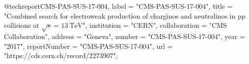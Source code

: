 @techreport{CMS-PAS-SUS-17-004,
      label          = "CMS-PAS-SUS-17-004",
      title         = "{Combined search for electroweak production of charginos
                       and neutralinos in pp collisions at $\sqrt{s} =
                       13~\mathrm{TeV}$}",
      institution   = "CERN",
      collaboration = "CMS Collaboration",
      address       = "Geneva",
      number        = "CMS-PAS-SUS-17-004",
      year          = "2017",
      reportNumber  = "CMS-PAS-SUS-17-004",
      url           = "https://cds.cern.ch/record/2273907",
}

